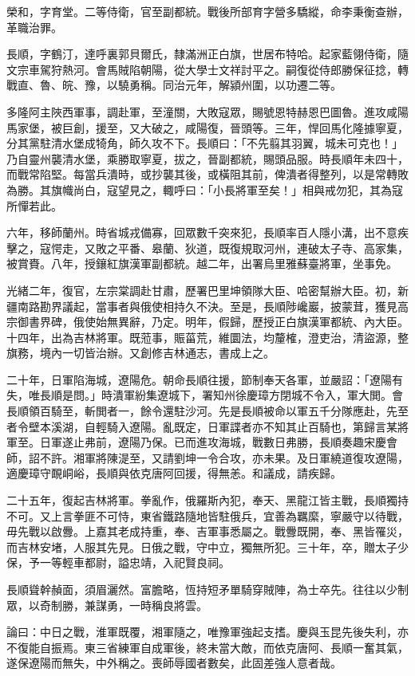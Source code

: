 \begin{pinyinscope}
榮和，字育堂。二等侍衛，官至副都統。戰後所部育字營多驕縱，命李秉衡查辦，革職治罪。

長順，字鶴汀，達呼裏郭貝爾氏，隸滿洲正白旗，世居布特哈。起家藍翎侍衛，隨文宗車駕狩熱河。會馬賊陷朝陽，從大學士文祥討平之。嗣復從侍郎勝保征捻，轉戰直、魯、皖、豫，以驍勇稱。同治元年，解潁州圍，以功遷二等。

多隆阿主陜西軍事，調赴軍，至潼關，大敗寇眾，賜號恩特赫恩巴圖魯。進攻咸陽馬家堡，被巨創，援至，又大破之，咸陽復，晉頭等。三年，悍回馬化隆據寧夏，分其黨駐清水堡成犄角，師久攻不下。長順曰：「不先翦其羽翼，城未可克也！」乃自靈州襲清水堡，乘勝取寧夏，拔之，晉副都統，賜頭品服。時長順年未四十，而戰常陷堅。每當兵潰時，或抄襲其後，或橫阻其前，俾潰者得整列，以是常轉敗為勝。其旗幟尚白，寇望見之，輙呼曰：「小長將軍至矣！」相與戒勿犯，其為寇所憚若此。

六年，移師蘭州。時省城戎備寡，回眾數千突來犯，長順率百人隱小溝，出不意疾擊之，寇愕走，又敗之平番、皋蘭、狄道，既復規取河州，連破太子寺、高家集，被賞賚。八年，授鑲紅旗漢軍副都統。越二年，出署烏里雅蘇臺將軍，坐事免。

光緒二年，復官，左宗棠調赴甘肅，歷署巴里坤領隊大臣、哈密幫辦大臣。初，新疆南路勘界議起，當事者與俄使相持久不決。至是，長順陟巉巖，披蒙茸，獲見高宗御書界碑，俄使始無異辭，乃定。明年，假歸，歷授正白旗漢軍都統、內大臣。十四年，出為吉林將軍。既蒞事，賑菑荒，維圜法，均釐榷，澄吏治，清盜源，整旗務，境內一切皆治辦。又創修吉林通志，書成上之。

二十年，日軍陷海城，遼陽危。朝命長順往援，節制奉天各軍，並嚴詔：「遼陽有失，唯長順是問。」時潰軍紛集遼城下，署知州徐慶璋方閉城不令入，軍大閧。會長順領百騎至，斬閧者一，餘令還駐沙河。先是長順被命以軍五千分隊應赴，先至者令壁本溪湖，自輕騎入遼陽。亂既定，日軍諜者亦不知其止百騎也，第歸言某將軍至。日軍遂止弗前，遼陽乃保。已而進攻海城，戰數日弗勝，長順奏趣宋慶會師，詔不許。湘軍將陳湜至，又請劉坤一令合攻，亦未果。及日軍繞道復攻遼陽，適慶璋守靦峒峪，長順與依克唐阿回援，得無恙。和議成，請疾歸。

二十五年，復起吉林將軍。拳亂作，俄羅斯內犯，奉天、黑龍江皆主戰，長順獨持不可。又上言拳匪不可恃，東省鐵路隨地皆駐俄兵，宜善為羈縻，寧嚴守以待戰，毋先戰以啟釁。上嘉其老成持重，奉、吉軍事悉屬之。戰釁既開，奉、黑皆罹災，而吉林安堵，人服其先見。日俄之戰，守中立，獨無所犯。三十年，卒，贈太子少保，予一等輕車都尉，謚忠靖，入祀賢良祠。

長順聳幹赬面，須眉灑然。富膽略，恆持短矛單騎穿賊陣，為士卒先。往往以少制眾，以奇制勝，兼謀勇，一時稱良將雲。

論曰：中日之戰，淮軍既覆，湘軍隨之，唯豫軍強起支搘。慶與玉昆先後失利，亦不復能自振焉。東三省練軍自成軍後，終未當大敵，而依克唐阿、長順一奮其氣，遂保遼陽而無失，中外稱之。喪師辱國者數矣，此固差強人意者哉。


\end{pinyinscope}